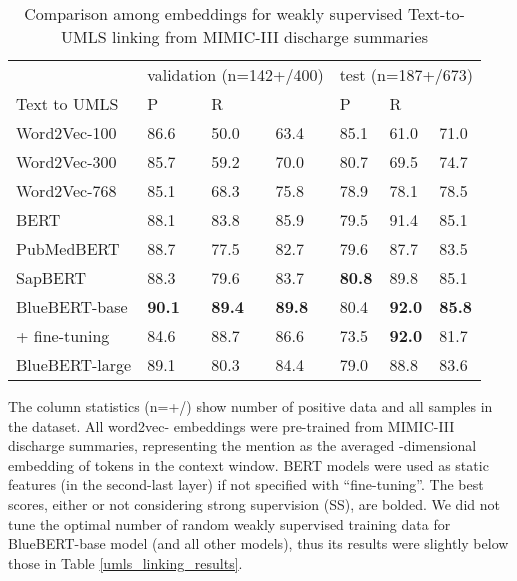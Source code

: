 \documentclass[twocolumn]{bmcart}
\begin{document}
\begin{table}[t]
\caption{Comparison among embeddings for weakly supervised Text-to-UMLS linking from MIMIC-III discharge summaries}
\scriptsize
\center
\label{umls_linking_embedding_results}
\begin{threeparttable}
\begin{tabular}{llll|lll}
\cline{1-7}
                            & \multicolumn{3}{l}{validation (n=142+/400)}         & \multicolumn{3}{l}{test (n=187+/673)}               \\
Text to UMLS      & P             & R              &          & P             & R              &        \\
\cline{1-7}
Word2Vec-100                     & 86.6          & 50.0           & 63.4          & 85.1          & 61.0           & 71.0\\
Word2Vec-300                     & 85.7          & 59.2           & 70.0          & 80.7          & 69.5           & 74.7\\
Word2Vec-768                     & 85.1          & 68.3           & 75.8          & 78.9          & 78.1           & 78.5\\
\cline{1-7}
BERT    & 88.1          & 83.8           & 85.9          & 79.5         & 91.4           & 85.1            \\
PubMedBERT & 88.7          & 77.5           & 82.7          & 79.6          & 87.7           & 83.5            \\
SapBERT & 88.3          & 79.6 & 83.7          & \textbf{80.8}          & 89.8 & 85.1         \\
BlueBERT-base & \textbf{90.1}          & \textbf{89.4}           & \textbf{89.8}          & 80.4          & \textbf{92.0}           & \textbf{85.8}                   \\
+ fine-tuning & 84.6          & 88.7           & 86.6          & 73.5          & \textbf{92.0}           & 81.7                   \\
BlueBERT-large & 89.1          & 80.3           & 84.4          & 79.0          & 88.8           & 83.6                   \\
\cline{1-7}
\end{tabular}
\begin{tablenotes}
\item The column statistics (n=+/) show number of positive data  and all samples  in the dataset. All word2vec- embeddings were pre-trained from MIMIC-III discharge summaries, representing the mention as the averaged -dimensional embedding of tokens in the context window. BERT models were used as static features (in the second-last layer) if not specified with ``fine-tuning''. The best scores, either or not considering strong supervision (SS), are bolded. We did not tune the optimal number of random weakly supervised training data for BlueBERT-base model (and all other models), thus its results were slightly below those in Table \ref{umls_linking_results}.
\end{tablenotes}
\end{threeparttable}
\end{table}
\end{document}
